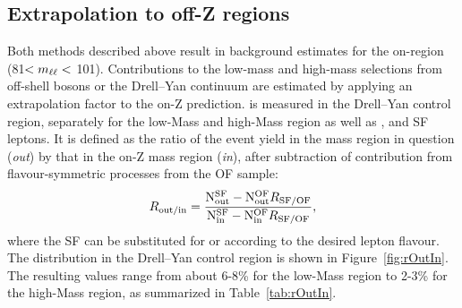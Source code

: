 \subsection{Extrapolation to off-Z regions}
Both methods described above result in background estimates for the on-\Z region (81\GeV $< m_{\ell\ell} < $ 101\GeV). Contributions to the low-mass and high-mass selections from off-shell \Z bosons or the Drell--Yan continuum are estimated by applying an extrapolation factor \Routin to the on-Z prediction. \Routin is measured in the Drell--Yan control region, separately for the low-Mass and high-Mass region as well as \EE, \MM and SF leptons. It is defined as the ratio of the event yield in the mass region in question (\textit{out}) by that in the on-Z mass region (\textit{in}), after subtraction of contribution from flavour-symmetric processes from the OF sample:
\begin{equation}
R_\text{out/in} = \frac{\mathrm{N}_{\mathrm{out}}^{\mathrm{SF}} - \mathrm{N}_{\mathrm{out}}^{\mathrm{OF}}R_{\text{SF/OF}}}{ \mathrm{N}_{\mathrm{in}}^{\mathrm{SF}} - \mathrm{N}_{\mathrm{in}}^{\mathrm{OF}}R_{\text{SF/OF}}},
\end{equation} 
where the SF can be substituted for \EE or \MM according to the desired lepton flavour. The \mll distribution in the Drell--Yan control region is shown in Figure~\ref{fig:rOutIn}. The resulting values range from about 6-8\% for the low-Mass region to 2-3\% for the high-Mass region, as summarized in Table~\ref{tab:rOutIn}.
